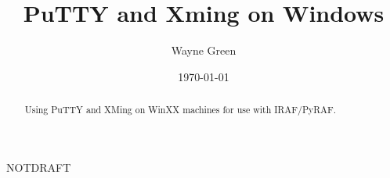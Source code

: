 \documentclass[letter,11pt,oneside]{article}
\def\documentisdraft{NOTDRAFT}
\begin{document}



\title{PuTTY and Xming on Windows}
\author{Wayne Green}
\date{\today}
\maketitle

\begin{abstract}
Using PuTTY and XMing on WinXX machines for use with IRAF/PyRAF.

\end{abstract}



\setcounter{section}{0}

\ifx\documentisdraft\drafttest
\linenumbers    %
\fi
{}

\setcounter{page}{0}




{}
\renewcommand*{\refname}{My Bibliography and References}




{}
\printindex %


\end{document}

